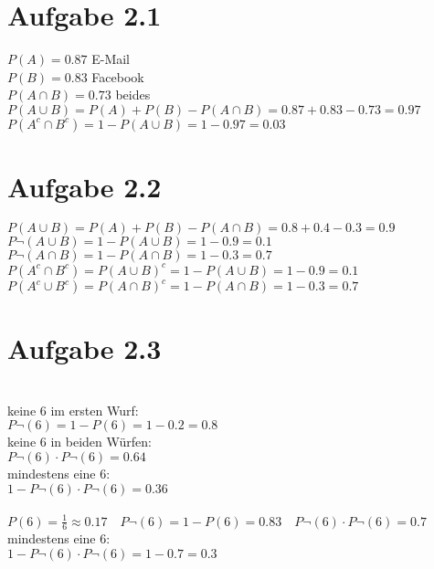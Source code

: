 \documentclass{article}
\begin{document}
 
	\section*{Aufgabe 2.1}
	$P(A) = 0.87$ E-Mail \\ 
	\newline
	$P(B) = 0.83$ Facebook \\
	\newline
	$P(A \cap B) = 0.73$ beides \\
	\newline
	$P(A \cup B) = P(A) + P(B) - P(A \cap B) = 0.87 + 0.83 - 0.73 = 0.97$ \\
	\newline
	$P(A^c \cap B^c) = 1 - P(A \cup B) = 1 - 0.97 = 0.03$
	
	\section*{Aufgabe 2.2}
	$P(A \cup B) = P(A) + P(B) - P(A \cap B) = 0.8 + 0.4 - 0.3 = 0.9$ \\
	\newline 
	$P\neg(A \cup B) = 1 - P(A \cup B) = 1 - 0.9 = 0.1$ \\
	\newline
	$P\neg(A \cap B) = 1 - P(A \cap B) = 1 - 0.3 = 0.7$ \\
	\newline
	$P(A^c \cap B^c) = P(A \cup B)^c = 1 - P(A \cup B) = 1 - 0.9 = 0.1  $ \\
	\newline 
	$P(A^c \cup B^c) = P(A \cap B)^c = 1 - P(A \cap B) = 1 - 0.3 = 0.7$
	
	\section*{Aufgabe 2.3}
	 \\
	\newline
	keine 6 im ersten Wurf: \\
	\newline
	$P\neg(6) = 1 - P(6) = 1 - 0.2 = 0.8$ \\
	\newline
	keine 6 in beiden Würfen: \\
	\newline 
	$P\neg(6) \cdot P\neg(6) = 0.64$ \\
	\newline 
	mindestens eine 6: \\
	\newline
	$1 - P\neg(6) \cdot P\neg(6) = 0.36$ \\
	\newline 
	 \\
	\newline
	$P(6) = \frac{1}{6} \approx 0.17 \quad P\neg(6) = 1 - P(6) = 0.83 \quad P\neg(6) \cdot P\neg(6) = 0.7 $ \\
	\newline
	mindestens eine 6: \\
	\newline
	$ 1 -P\neg(6) \cdot P\neg(6) = 1 - 0.7 = 0.3$
	\pagebreak 
	
\end{document}
